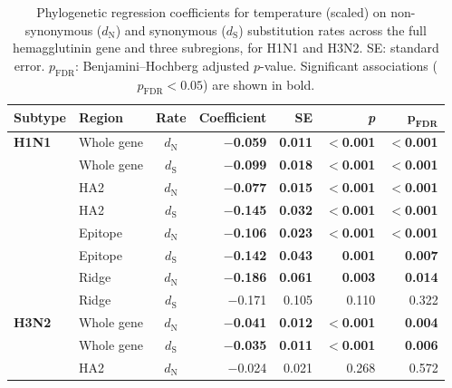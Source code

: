\documentclass[12pt]{article}
\begin{document}
\begin{table}[H]
    \centering
    \caption{Phylogenetic regression coefficients for temperature (scaled) on non-synonymous ($d_{\text{N}}$) and synonymous ($d_{\text{S}}$) substitution rates across the full hemagglutinin gene and three subregions, for H1N1 and H3N2. SE: standard error. $p_{\text{FDR}}$: Benjamini--Hochberg adjusted $p$-value. Significant associations ($p_{\text{FDR}} < 0.05$) are shown in bold.}
    \label{tab:s1_epitope_p}
    \begin{tabular}{llcrrrr}
        \toprule
        \textbf{Subtype} & \textbf{Region} & \textbf{Rate} & \textbf{Coefficient} & \textbf{SE} & \textbf{\textit{p}} & $\boldsymbol{p_{\text{FDR}}}$ \\
        \midrule
        \textbf{H1N1} & Whole gene & $d_{\text{N}}$ & \textbf{$-$0.059} & \textbf{0.011} & \textbf{$<$0.001} & \textbf{$<$0.001} \\
                      & Whole gene & $d_{\text{S}}$  & \textbf{$-$0.099} & \textbf{0.018} & \textbf{$<$0.001} & \textbf{$<$0.001} \\
                      & HA2        & $d_{\text{N}}$ & \textbf{$-$0.077} & \textbf{0.015} & \textbf{$<$0.001} & \textbf{$<$0.001} \\
                      & HA2        & $d_{\text{S}}$  & \textbf{$-$0.145} & \textbf{0.032} & \textbf{$<$0.001} & \textbf{$<$0.001} \\
                      & Epitope    & $d_{\text{N}}$ & \textbf{$-$0.106} & \textbf{0.023} & \textbf{$<$0.001} & \textbf{$<$0.001} \\
                      & Epitope    & $d_{\text{S}}$  & \textbf{$-$0.142} & \textbf{0.043} & \textbf{0.001}    & \textbf{0.007}    \\
                      & Ridge      & $d_{\text{N}}$ & \textbf{$-$0.186} & \textbf{0.061} & \textbf{0.003}    & \textbf{0.014}    \\
                      & Ridge      & $d_{\text{S}}$  & $-$0.171          & 0.105          & 0.110             & 0.322             \\
        \midrule
        \textbf{H3N2} & Whole gene & $d_{\text{N}}$ & \textbf{$-$0.041} & \textbf{0.012} & \textbf{$<$0.001} & \textbf{0.004}    \\
                      & Whole gene & $d_{\text{S}}$  & \textbf{$-$0.035} & \textbf{0.011} & \textbf{$<$0.001} & \textbf{0.006}    \\
                      & HA2        & $d_{\text{N}}$ & $-$0.024          & 0.021          & 0.268             & 0.572             \\

\end{tabular}
\end{table}
\end{document}
